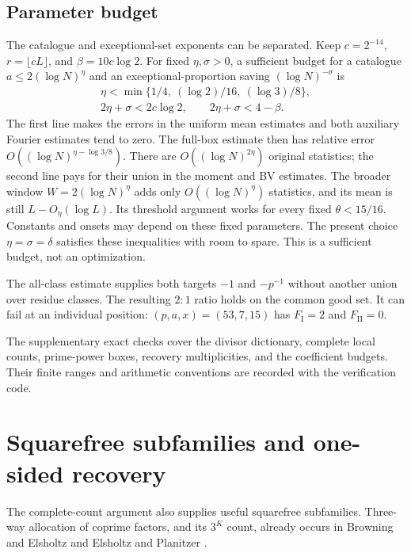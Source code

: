 \documentclass[11pt]{article}
\theoremstyle{remark}\newtheorem{remark}[theorem]{Remark}
\newcommand{\FI}{F_{\mathrm I}}
\newcommand{\FII}{F_{\mathrm {II}}}
\begin{document}
\subsection{Parameter budget}
The catalogue and exceptional-set exponents can be separated. Keep
$c=2^{-14}$, $r=\lfloor cL\rfloor$, and $\beta=10c\log2$.
For fixed $\eta,\sigma>0$, a sufficient budget for a catalogue
$a\le2(\log N)^\eta$ and an exceptional-proportion saving
$(\log N)^{-\sigma}$ is
\begin{equation}\label{eq:separate-budget}
\begin{gathered}
 \eta<\min\{1/4,\ (\log2)/16,\ (\log3)/8\},\\
 2\eta+\sigma<2c\log2,\qquad 2\eta+\sigma<4-\beta.
\end{gathered}
\end{equation}
The first line makes the errors in the uniform mean estimates and both
auxiliary Fourier estimates tend to zero. The full-box estimate then
has relative error $O((\log N)^{\eta-\log3/8})$.
There are $O((\log N)^{2\eta})$ original statistics; the second line
pays for their union in the moment and BV estimates. The broader
window $W=2(\log N)^\eta$ adds only $O((\log N)^\eta)$ statistics,
and its mean is still $L-O_\eta(\log L)$. Its threshold argument works
for every fixed $\theta<15/16$. Constants and onsets may depend on
these fixed parameters. The present choice $\eta=\sigma=\delta$
satisfies these inequalities with room to spare. This is a sufficient
budget, not an optimization.

The all-class estimate supplies both targets $-1$ and $-p^{-1}$
without another union over residue classes. The resulting $2:1$ ratio
holds on the common good set. It can fail at an individual position:
$(p,a,x)=(53,7,15)$ has $\FI=2$ and $\FII=0$.

The supplementary exact checks cover the divisor dictionary, complete
local counts, prime-power boxes, recovery multiplicities, and the
coefficient budgets. Their finite ranges and arithmetic conventions
are recorded with the verification code.

\appendix
\section{Squarefree subfamilies and one-sided recovery}\label{app:auxiliary}
The complete-count argument also supplies useful squarefree
subfamilies. Three-way allocation of coprime factors, and its $3^K$
count, already occurs in Browning and Elsholtz \cite[Section~2]{BE}
and Elsholtz and Planitzer \cite[Section~7]{EP}.
\end{document}
